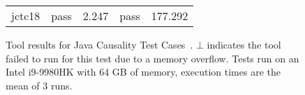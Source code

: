 \begin{figure}[t]
\begin{center}
\begin{tabularx}{0.9\textwidth}{c||c|c|c|c}
    jctc18                         & pass   & 2.247               & pass   & 177.292 \\
  \end{tabularx}
  \caption{\label{fig:tool} Tool results for Java Causality Test Cases~\cite{PughWebsite}. $\bot$ indicates the tool failed to run for this test due to a memory overflow. Tests run on an Intel i9-9980HK with 64 GB of memory, execution times are the mean of 3 runs.}
\end{center}
\end{figure}

